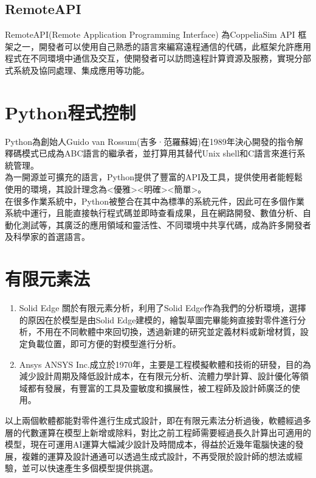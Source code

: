 \subsection{RemoteAPI}
RemoteAPI(Remote Application Programming Interface) 為CoppeliaSim API 框架之一，開發者可以使用自己熟悉的語言來編寫遠程通信的代碼，此框架允許應用程式在不同環境中通信及交互，使開發者可以訪問遠程計算資源及服務，實現分部式系統及協同處理、集成應用等功能。\\

\section{Python程式控制}
Python為創始人Guido van Rossum(吉多·范羅蘇姆)在1989年決心開發的指令解釋碼模式已成為ABC語言的繼承者，並打算用其替代Unix shell和C語言來進行系統管理。\\

為一開源並可擴充的語言，Python提供了豐富的API及工具，提供使用者能輕鬆使用的環境，其設計理念為<優雅><明確><簡單>。\\

在很多作業系統中，Python被整合在其中為標準的系統元件，因此可在多個作業系統中運行，且能直接執行程式碼並即時查看成果，且在網路開發、數值分析、自動化測試等，其廣泛的應用領域和靈活性、不同環境中共享代碼，成為許多開發者及科學家的首選語言。\\

\section{有限元素法}
\begin{enumerate}
\item Solid Edge
關於有限元素分析，利用了Solid Edge作為我們的分析環境，選擇的原因在於模型是由Solid Edge建模的，繪製草圖完畢能夠直接對零件進行分析，不用在不同軟體中來回切換，透過新建的研究並定義材料或新增材質，設定負載位置，即可方便的對模型進行分析。\\

\item Ansys
ANSYS Inc.成立於1970年，主要是工程模擬軟體和技術的研發，目的為減少設計周期及降低設計成本，在有限元分析、流體力學計算、設計優化等領域都有發展，有豐富的工具及靈敏度和擴展性，被工程師及設計師廣泛的使用。\\
\end{enumerate}

以上兩個軟體都能對零件進行生成式設計，即在有限元素法分析過後，軟體經過多層的代數運算在模型上新增或除料，對比之前工程師需要經過長久計算出可適用的模型，現在可運用AI運算大幅減少設計及時間成本，得益於近幾年電腦快速的發展，複雜的運算及設計通通可以透過生成式設計，不再受限於設計師的想法或經驗，並可以快速產生多個模型提供挑選。
\newpage
